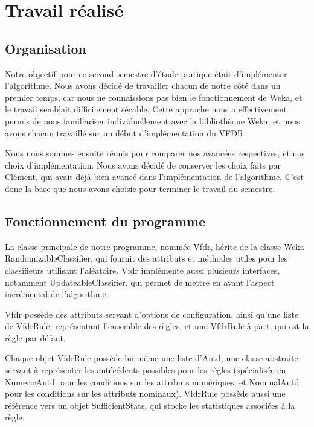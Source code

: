 \section{Travail réalisé}

    \subsection{Organisation} 

        Notre objectif pour ce second semestre d’étude pratique était d’implémenter l’algorithme. Nous avons décidé de travailler chacun de notre côté dans un premier temps, car nous ne connaissions pas bien le fonctionnement de Weka, et le travail semblait difficilement sécable. Cette approche nous a effectivement permis de nous familiariser individuellement avec la bibliothèque Weka, et nous avons chacun travaillé sur un début d’implémentation du VFDR.

        Nous nous sommes ensuite réunis pour comparer nos avancées respectives, et nos choix d’implémentation. Nous avons décidé de conserver les choix faits par Clément, qui avait déjà bien avancé dans l’implémentation de l’algorithme. C’est donc la base que nous avons choisie pour terminer le travail du semestre.

    \subsection{Fonctionnement du programme}

        La classe principale de notre programme, nommée Vfdr, hérite de la classe Weka RandomizableClassifier, qui fournit des attributs et méthodes utiles pour les classifieurs utilisant l’aléatoire. Vfdr implémente aussi plusieurs interfaces, notamment UpdateableClassifier, qui permet de mettre en avant l’aspect incrémental de l’algorithme.

        Vfdr possède des attributs servant d’options de configuration, ainsi qu’une liste de VfdrRule, représentant l’ensemble des règles, et une VfdrRule à part, qui est la règle par défaut.

        Chaque objet VfdrRule possède lui-même une liste d’Antd, une classe abstraite servant à représenter les antécédents possibles pour les règles (spécialisée en NumericAntd pour les conditions sur les attributs numériques, et NominalAntd pour les conditions sur les attributs nominaux). VfdrRule possède aussi une référence vers un objet SufficientStats, qui stocke les statistiques associées à la règle. 

